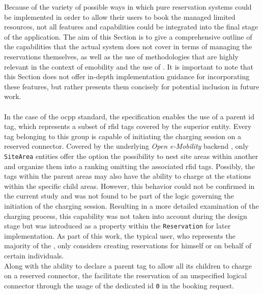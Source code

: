 Because of the variety of possible ways in which pure reservation systems could be implemented in order to allow their users to book the managed limited resources, not all features and capabilities could be integrated into the final stage of the application.
The aim of this Section is to give a comprehensive outline of the capabilities that the actual system does not cover in terms of managing the reservations themselves, as well as the use of methodologies that are highly relevant in the context of \acrshort{emobility} and the use of .
It is important to note that this Section does not offer in-depth implementation guidance for incorporating these features, but rather presents them concisely for potential inclusion in future work. \\ \\
\noindent In the case of the \acrshort{ocpp} standard, the specification enables the use of a parent \acrshort{id} tag, which represents a subset of \acrshort{rfid} tags covered by the superior entity. Every tag belonging to this group is capable of initiating the charging session on a reserved connector.
Covered by the underlying \textit{Open e-Mobility} backend \cite{noauthor_github_nodate-2}, only \texttt{SiteArea} entities offer the option the possibility to nest site areas within another and organize them into a ranking omitting the associated \acrshort{rfid} tags.
Possibly, the tags within the parent areas may also have the ability to charge at the stations within the specific child areas. However, this behavior could not be confirmed in the current study and was not found to be part of the logic governing the initiation of the charging session.
Resulting in a more detailed examination of the charging process, this capability was not taken into account during the design stage but was introduced as a property within the \texttt{Reservation} for later implementation.
As part of this work, the typical user, who represents the majority of the , only considers creating reservations for himself or on behalf of certain individuals. \\ 
Along with the ability to declare a parent tag to allow all its children to charge on a reserved connector, the  facilitate the reservation of an unspecified logical connector through the usage of the dedicated \acrshort{id} \texttt{0} in the booking request.
